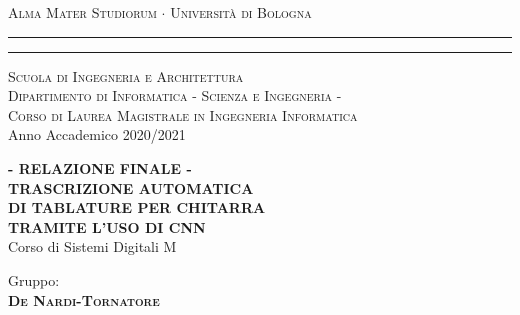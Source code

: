 \begin{titlepage}
\begin{center}
    {{\Large{\textsc{Alma Mater Studiorum $\cdot$ Universit\`a di
    Bologna}}}}
	\rule[0.1cm]{15.8cm}{0.1mm}
    \rule[0.5cm]{15.8cm}{0.6mm}
    {\normalsize{\textsc { Scuola di Ingegneria e Architettura\\
    \vspace{5mm}
    Dipartimento di Informatica - Scienza e Ingegneria -\\
    \vspace{5mm}
    Corso di Laurea Magistrale in Ingegneria Informatica}}}\\
	\vspace{10mm}
	{\small{\sc Anno Accademico 2020/2021}}%
\end{center}
\vspace{10mm}
\begin{center}
    {\LARGE\textbf{- RELAZIONE FINALE -}}\\
    \vspace{3mm}
    {\LARGE\textbf{TRASCRIZIONE AUTOMATICA}}\\
    \vspace{3mm}
    {\LARGE\textbf{ DI TABLATURE PER CHITARRA}}\\
    \vspace{3mm}
    {\LARGE{\bf TRAMITE L'USO DI CNN}}\\
    \vspace{10mm} {\large{\sc Corso di Sistemi Digitali M}}
\end{center}
\vfill
\par
\noindent
\begin{minipage}[t]{0.47\textwidth}
    {\large{\sc Gruppo:}\\
    {\bf \textsc{De Nardi-Tornatore}}}\\
\end{minipage}
\vspace{20mm}
\end{titlepage}
\restoregeometry

